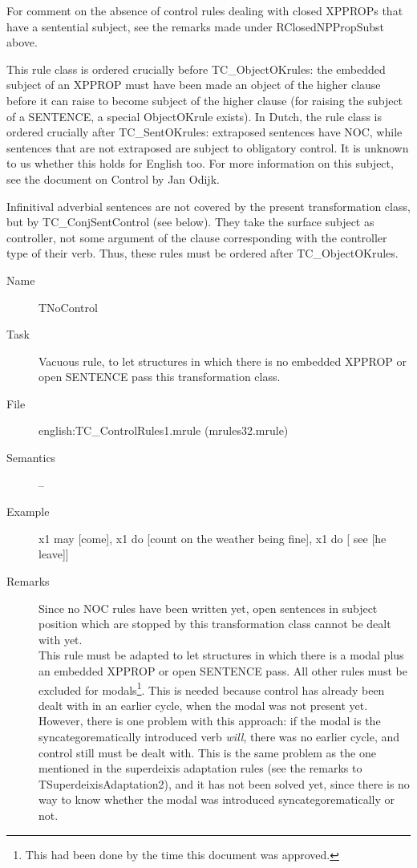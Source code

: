 \begin{description}
For comment on the absence of control rules dealing with closed XPPROPs that 
have a sentential subject, see the remarks made under RClosedNPPropSubst above.

This rule class is ordered crucially before TC\_ObjectOKrules: the embedded 
subject of an XPPROP must have been made an object of the higher clause 
before it can raise to become subject of the higher clause (for raising 
the subject of a SENTENCE, a special ObjectOKrule exists). In Dutch, the rule 
class is 
ordered crucially after TC\_SentOKrules: extraposed sentences have NOC, while 
sentences that are not extraposed are subject to obligatory control. It is 
unknown to us whether this holds for English too. For more information on this 
subject, see the document on Control by Jan Odijk.

Infinitival adverbial sentences are not covered by the present transformation 
class, but by TC\_ConjSentControl (see below). They take the surface subject as 
controller, not some argument of the clause corresponding with the controller 
type of their verb. Thus, these rules must be ordered 
after TC\_ObjectOKrules.

\vspace{1 cm}
\begin{description}
\item[Name] TNoControl
\item[Task] Vacuous rule, to let structures in which there is no embedded 
XPPROP or open SENTENCE pass this transformation class.
\item[File] english:TC\_ControlRules1.mrule (mrules32.mrule)
\item[Semantics] --
\item[Example] x1 may [come], x1 do [count on the weather being fine], x1 do [
see [he leave]]
\item[Remarks] Since no NOC rules have been written yet, open sentences in 
subject position which are stopped by this transformation class cannot be dealt 
with yet.\\
This rule must 
be adapted to let structures in which there is a modal plus an embedded 
XPPROP or open SENTENCE pass. All other rules must be excluded for 
modals\footnote{This had been done by the time this document was approved.}. 
This is needed because control has already been 
dealt with in an earlier cycle, when the modal was not present yet. However, 
there is one problem with this approach: if the modal is the 
syncategorematically introduced verb {\em will\/}, there was no earlier cycle, 
and control still must be dealt with. This is the same problem as the one 
mentioned in the superdeixis adaptation rules (see the remarks to 
TSuperdeixisAdaptation2), and it has not been solved yet, since there is no way 
to know whether the modal was introduced syncategorematically or not.
\end{description}


\end{description}
